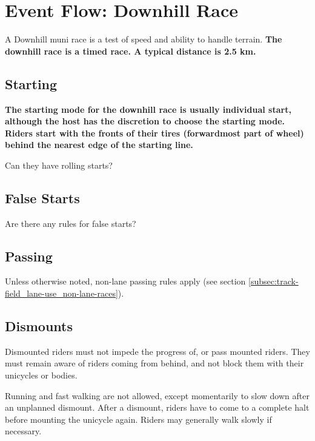\section{Event Flow: Downhill Race \label{sec:muni_downhill}}

A Downhill muni race is a test of speed and ability to handle terrain. \textbf{The downhill race is a timed race. A typical distance is 2.5 km.}

\subsection{Starting}

\textbf{The starting mode for the downhill race is usually individual 
start, although the host has the discretion to choose the starting 
mode. Riders start with the fronts of their tires (forwardmost part of wheel) behind the nearest edge of the starting line.}

\begin{framed}
Can they have rolling starts?
\end{framed}

\subsection{False Starts}

\begin{framed}
Are there any rules for false starts?
\end{framed}

\subsection{Passing}

Unless otherwise noted, non-lane passing rules apply (see section \ref{subsec:track-field_lane-use_non-lane-races}).

\subsection{Dismounts}

Dismounted riders must not impede the progress of, or pass mounted riders.
They must remain aware of riders coming from behind, and not block them with their
unicycles or bodies.

Running and fast walking are not allowed, except momentarily to slow down after an unplanned dismount.
After a dismount, riders have to come to a complete halt before mounting the unicycle again.
Riders may generally walk slowly if necessary.

